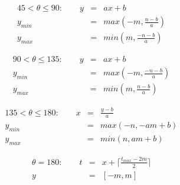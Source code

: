 \begin{eqnarray}
45 < \theta \leq 90: \qquad  y &=& ax+b \nonumber \\
	y_{min} &=& max(-m, \frac{n-b}{a}) \nonumber \\
	y_{max} &=& min(m, \frac{-n-b}{a}) \nonumber 
\end{eqnarray}

\begin{eqnarray}
90 < \theta \leq 135: \qquad  y &=& ax+b \nonumber \\
	y_{min} &=& max(-m, \frac{-n-b}{a}) \nonumber \\
	y_{max} &=& min(m, \frac{n-b}{a}) \nonumber 
\end{eqnarray}

\begin{eqnarray}
135 < \theta \leq 180: \qquad  x &=& \frac{y-b}{a} \nonumber \\
	y_{min} &=& max(-n, -am + b) \nonumber \\
	y_{max} &=& min(n, am + b) \nonumber 
\end{eqnarray}

\begin{eqnarray}
\theta = 180: \qquad  t &=& x+ \lceil \frac{t_{max}-2m}{2} \rceil \nonumber \\
	y &=& [-m, m] \nonumber
\end{eqnarray}
